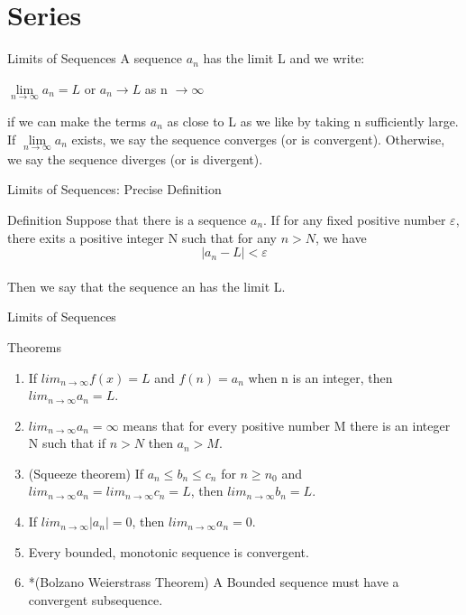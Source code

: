 

\section{Series}



\begin{frame}{Limits of Sequences}
    A sequence {$a_n$} has the limit L and we write:
    \begin{center}
        $ \mathop{lim} \limits_{n \rightarrow \infty} a_n = L$ or $a_n \rightarrow L$ as n $\rightarrow \infty$
    \end{center}
    if we can make the terms $a_n$ as close to L as we like by taking n sufficiently large. If $\mathop{lim} \limits_{n \rightarrow \infty} a_n$ exists, we say the sequence converges (or is convergent). Otherwise, we say the sequence diverges (or is divergent).
\end{frame}




\begin{frame}{Limits of Sequences: Precise Definition}
    \begin{block}{Definition}
        Suppose that there is a sequence $a_n$. If for any fixed positive number $\varepsilon$, there exits a positive integer N such that for any $n > N$, we have\\
        $$|a_n - L|< \varepsilon$$\\
        Then we say that the sequence an has the limit L.
    \end{block}

\end{frame}



\begin{frame}{Limits of Sequences}
    \begin{block}{Theorems}
        \begin{enumerate}
            \item  If $lim_{n\rightarrow \infty} f (x) = L$ and $f (n) = a_n$ when n is an integer, then $lim_{n\rightarrow \infty} a_n = L$.
            \item $lim_{n\rightarrow \infty} a_n = \infty$ means that for every positive number M there is an integer N such that if $n > N$ then $a_n > M$.
            \item  (Squeeze theorem) If $a_n \leqslant b_n \leqslant c_n$ for $n \geqslant n_0$ and $lim_{n \rightarrow \infty} a_n = lim_{n \rightarrow \infty} c_n = L$, then $lim_{n\rightarrow\infty} b_n = L$.
            \item If $lim_{n \rightarrow \infty} |a_n| = 0$, then $lim_{n \rightarrow \infty} a_n = 0$.
            \item Every bounded, monotonic sequence is convergent.
            \item *(Bolzano Weierstrass Theorem) A Bounded sequence must have a convergent subsequence.
        \end{enumerate}
    \end{block}
\end{frame}


